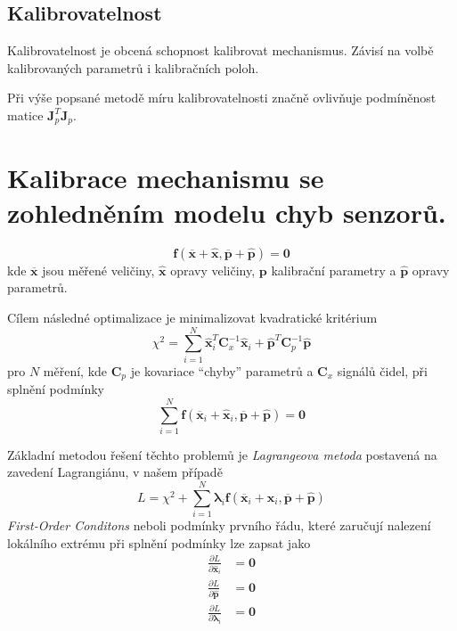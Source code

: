 \documentclass{article}
\begin{document}
	\subsection*{Kalibrovatelnost}

	Kalibrovatelnost je obcená schopnost kalibrovat mechanismus. Závisí na volbě kalibrovaných parametrů i kalibračních poloh.

	Při výše popsané metodě míru kalibrovatelnosti značně ovlivňuje podmíněnost matice $\bm{J}_p^T \bm{J}_p$.

	\section{Kalibrace mechanismu se zohledněním modelu chyb senzorů.}
	\begin{equation}
		\bm{f}(\bm{\overline{x}}+\bm{\hat{x}},\bm{\overline{p}}+\bm{\hat{p}}) = \bm{0}
	\end{equation}
	kde $\bm{\overline{x}}$ jsou měřené veličiny, $\bm{\hat{x}}$ opravy veličiny, $\bm{p}$ kalibrační parametry a $\bm{\hat{p}}$ opravy parametrů.

	Cílem následné optimalizace je minimalizovat kvadratické kritérium
	\begin{equation}
	\chi^2 = \sum_{i=1}^N \bm{\hat{x}}_i^T \bm{C}_x^{-1} \bm{\hat{x}}_i + \bm{\hat{p}}^T \bm{C}_p^{-1} \bm{\hat{p}} 
	\end{equation}
	pro $N$ měření, kde $\bm{C}_p$ je kovariace ``chyby'' parametrů a $\bm{C}_x$ signálů čidel, při splnění podmínky
	\begin{equation}
		\sum_{i=1}^N \bm{f}(\bm{\overline{x}}_i+\bm{\hat{x}}_i,\bm{\overline{p}}+\bm{\hat{p}}) = \bm{0}
	\end{equation}

	Základní metodou řešení těchto problemů je \emph{Lagrangeova metoda} postavená na zavedení Lagrangiánu, v našem případě
	\begin{equation}
		L = \chi^2 + \sum_{i=1}^N \bm{\lambda}_i \bm{f}(\bm{\overline{x}}_i+\bm{\hat{x}}_i,\bm{\overline{p}}+\bm{\hat{p}})
	\end{equation}
	\emph{First-Order Conditons} neboli podmínky prvního řádu, které zaručují nalezení lokálního extrému při splnění podmínky lze zapsat jako
	\begin{align}
		\frac{\partial L}{\partial \bm{\hat{x}}_i} &= \bm{0} \\
		\frac{\partial L}{\partial \bm{\hat{p}}} &= \bm{0} \\
		\frac{\partial L}{\partial \bm{\lambda}_i} &= \bm{0}
	\end{align}
	
\end{document}
